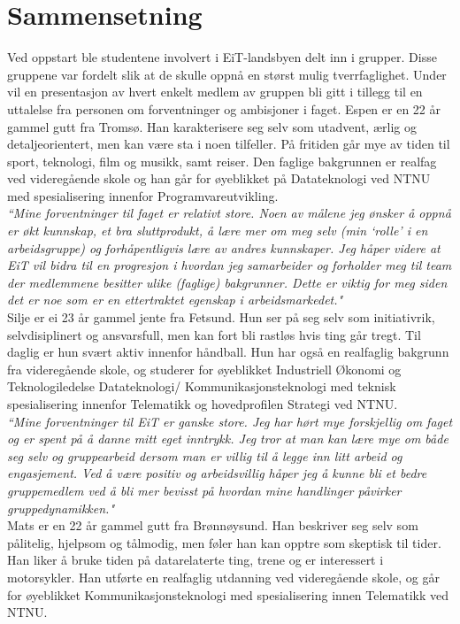 \section{Sammensetning}
Ved oppstart ble studentene involvert i EiT-landsbyen delt inn i grupper. Disse gruppene var fordelt slik at de skulle oppnå en størst mulig tverrfaglighet. Under vil en presentasjon av hvert enkelt medlem av gruppen bli gitt i tillegg til en uttalelse fra personen om forventninger og ambisjoner i faget.
Espen er en 22 år gammel gutt fra Tromsø. Han karakterisere seg selv som utadvent, ærlig og detaljeorientert, men kan være sta i noen tilfeller. På fritiden går mye av tiden til sport, teknologi, film og musikk, samt reiser. Den faglige bakgrunnen er realfag ved videregående skole og han går for øyeblikket på Datateknologi ved NTNU med spesialisering innenfor Programvareutvikling.\\

\textit{``Mine forventninger til faget er relativt store. Noen av målene jeg ønsker å oppnå er økt kunnskap, et bra sluttprodukt, å lære mer om meg selv (min `rolle' i en arbeidsgruppe) og forhåpentligvis lære av andres kunnskaper. Jeg håper videre at EiT vil bidra til en progresjon i hvordan jeg samarbeider og forholder meg til team der medlemmene besitter ulike (faglige) bakgrunner. Dette er viktig for meg siden det er noe som er en ettertraktet egenskap i arbeidsmarkedet."}\\

Silje er ei 23 år gammel jente fra Fetsund. Hun ser på seg selv som initiativrik, selvdisiplinert og ansvarsfull, men kan fort bli rastløs hvis ting går tregt. Til daglig er hun svært aktiv innenfor håndball. Hun har også en realfaglig bakgrunn fra videregående skole, og studerer for øyeblikket Industriell Økonomi og Teknologiledelse Datateknologi/ Kommunikasjonsteknologi med teknisk spesialisering innenfor Telematikk og hovedprofilen Strategi ved NTNU.\\

\textit{``Mine forventninger til EiT er ganske store. Jeg har hørt mye forskjellig om faget og er spent på å danne mitt eget inntrykk. Jeg tror at man kan lære mye om både seg selv og gruppearbeid dersom man er villig til å legge inn litt arbeid og engasjement. Ved å være positiv og arbeidsvillig håper jeg å kunne bli et bedre gruppemedlem ved å bli mer bevisst på hvordan mine handlinger påvirker gruppedynamikken."}\\

Mats er en 22 år gammel gutt fra Brønnøysund. Han beskriver seg selv som pålitelig, hjelpsom og tålmodig, men føler han kan opptre som skeptisk til tider. Han liker å bruke tiden på datarelaterte ting, trene og er interessert i motorsykler. Han utførte en realfaglig utdanning ved videregående skole, og går for øyeblikket Kommunikasjonsteknologi med spesialisering innen Telematikk ved NTNU.\\

